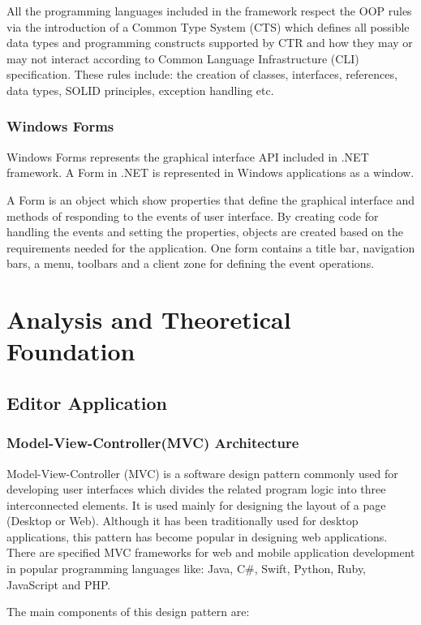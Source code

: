 \documentclass[12pt,a4paper,twoside]{report}
\begin{document}
All the programming languages included in the framework respect the OOP rules via the introduction of a Common Type System (CTS) which defines all possible data types and programming constructs supported by CTR and how they may or may not interact according to Common Language Infrastructure (CLI) specification. These rules include: the creation of classes, interfaces, references, data types, SOLID principles, exception handling etc. 

\subsection{Windows Forms}
Windows Forms represents the graphical interface API included in .NET framework. A Form in .NET is represented in Windows applications as a window.

A Form is an object which show properties that define the graphical interface and methods of responding to the events of user interface. By creating code for handling the events and setting the properties, objects are created based on the requirements needed for the application. One form contains a title bar, navigation bars, a menu, toolbars and a client zone for defining the event operations.

\chapter{Analysis and Theoretical Foundation}
\section{Editor Application}
\subsection{Model-View-Controller(MVC) Architecture}

Model-View-Controller (MVC) is a software design pattern commonly used for developing user interfaces which divides the related program logic into three interconnected elements. It is used mainly for designing the layout of a page (Desktop or Web). Although it has been traditionally used for desktop applications, this pattern has become popular in designing web applications. There are specified MVC frameworks for web and mobile application development in popular programming languages like: Java, C\#, Swift, Python, Ruby, JavaScript and PHP.


The main components of this design pattern are:
\end{document}
